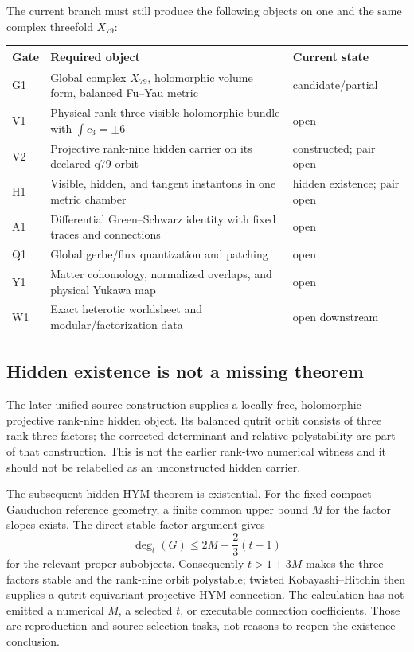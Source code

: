 \documentclass[11pt]{article}
\theoremstyle{definition}
\theoremstyle{remark}
\begin{document}
The current branch must still produce the following objects on one and the
same complex threefold \(X_{79}\):
\begin{center}
\small
\begin{tabular}{>{\raggedright\arraybackslash}p{}
                >{\raggedright\arraybackslash}p{}
                >{\raggedright\arraybackslash}p{}}
\toprule
Gate & Required object & Current state \\
\midrule
G1 & Global complex \(X_{79}\), holomorphic volume form, balanced Fu--Yau metric
   & candidate/partial \\
V1 & Physical rank-three visible holomorphic bundle with \(\int c_3=\pm6\)
   & open \\
V2 & Projective rank-nine hidden carrier on its declared q79 orbit
   & constructed; pair open \\
H1 & Visible, hidden, and tangent instantons in one metric chamber
   & hidden existence; pair open \\
A1 & Differential Green--Schwarz identity with fixed traces and connections
   & open \\
Q1 & Global gerbe/flux quantization and patching
   & open \\
Y1 & Matter cohomology, normalized overlaps, and physical Yukawa map
   & open \\
W1 & Exact heterotic worldsheet and modular/factorization data
   & open downstream \\
\bottomrule
\end{tabular}
\end{center}

\subsection{Hidden existence is not a missing theorem}

The later unified-source construction supplies a locally free,
holomorphic projective rank-nine hidden object. Its balanced qutrit
orbit consists of three rank-three factors; the corrected determinant
and relative polystability are part of that construction. This is not
the earlier rank-two numerical witness and it should not be relabelled
as an unconstructed hidden carrier.

The subsequent hidden HYM theorem is existential. For the fixed compact
Gauduchon reference geometry, a finite common upper bound $M$ for the
factor slopes exists. The direct stable-factor argument gives
\[
 \deg_t(G)\leq 2M-\frac{2}{3}(t-1)
\]
for the relevant proper subobjects. Consequently $t>1+3M$ makes the
three factors stable and the rank-nine orbit polystable; twisted
Kobayashi--Hitchin then supplies a qutrit-equivariant projective HYM
connection. The calculation has not emitted a numerical $M$, a selected
$t$, or executable connection coefficients. Those are reproduction and
source-selection tasks, not reasons to reopen the existence conclusion.
\end{document}
